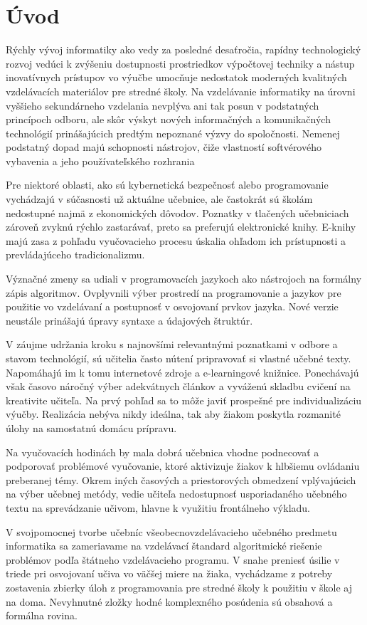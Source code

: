 \chapter{Úvod}
Rýchly vývoj informatiky ako vedy za posledné desaťročia, rapídny technologický rozvoj vedúci k zvýšeniu dostupnosti prostriedkov výpočtovej techniky a nástup inovatívnych prístupov vo výučbe umocňuje nedostatok moderných kvalitných vzdelávacích materiálov pre stredné školy. Na vzdelávanie informatiky na úrovni vyššieho sekundárneho vzdelania nevplýva ani tak posun v podstatných princípoch odboru, ale skôr výskyt nových informačných a komunikačných technológií prinášajúcich predtým nepoznané výzvy do spoločnosti. Nemenej podstatný dopad majú schopnosti nástrojov, čiže vlastností softvérového vybavenia a jeho používateľského rozhrania

Pre niektoré oblasti, ako sú kybernetická bezpečnosť alebo programovanie vychádzajú v súčasnosti už aktuálne učebnice, ale častokrát sú školám nedostupné najmä z ekonomických dôvodov. Poznatky v tlačených učebniciach zároveň zvyknú rýchlo zastarávať, preto sa preferujú elektronické knihy. E-knihy majú zasa z pohľadu vyučovacieho procesu úskalia ohľadom ich prístupnosti a prevládajúceho tradicionalizmu.

Význačné zmeny sa udiali v programovacích jazykoch ako nástrojoch na formálny zápis algoritmov. Ovplyvnili výber prostredí na programovanie a jazykov pre použitie vo vzdelávaní a postupnosť v osvojovaní prvkov jazyka. Nové verzie neustále prinášajú úpravy syntaxe a údajových štruktúr.

V záujme udržania kroku s najnovšími relevantnými poznatkami v odbore a stavom technológií, sú učitelia často nútení pripravovať si vlastné učebné texty. Napomáhajú im k tomu internetové zdroje a e-learningové knižnice. Ponechávajú však časovo náročný výber adekvátnych článkov a vyváženú skladbu cvičení na kreativite učiteľa. Na prvý pohľad sa to môže javiť prospešné pre individualizáciu výučby. Realizácia nebýva nikdy ideálna, tak aby žiakom poskytla rozmanité úlohy na samostatnú domácu prípravu.

Na vyučovacích hodinách by mala dobrá učebnica vhodne podnecovať a podporovať problémové vyučovanie, ktoré aktivizuje žiakov k hlbšiemu ovládaniu preberanej témy. Okrem iných časových a priestorových obmedzení vplývajúcich na výber učebnej metódy, vedie učiteľa nedostupnosť usporiadaného učebného textu na sprevádzanie učivom, hlavne k využitiu frontálneho výkladu.

V svojpomocnej tvorbe učebníc všeobecnovzdelávacieho učebného predmetu informatika sa zameriavame na vzdelávací štandard algoritmické riešenie problémov podľa štátneho vzdelávacieho programu. V snahe preniesť úsilie v triede pri osvojovaní učiva vo väčšej miere na žiaka, vychádzame z potreby zostavenia zbierky úloh z programovania pre stredné školy k použitiu v škole aj na doma. Nevyhnutné zložky hodné komplexného posúdenia sú obsahová a formálna rovina.

